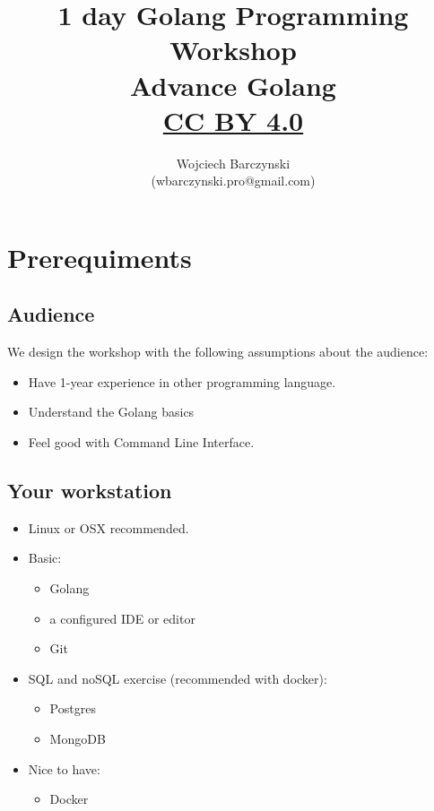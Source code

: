 \documentclass[11pt, letterpaper]{article}
\title{1 day Golang Programming Workshop\\Advance Golang\\{ \small \href{https://creativecommons.org/licenses/by/4.0/}{CC BY 4.0} }  }
\author{Wojciech Barczynski\\(wbarczynski.pro@gmail.com)}
\date{}
\begin{document}

\begin{titlepage}
\maketitle
\end{titlepage}

\tableofcontents
\pagebreak
\section{Prerequiments}

\subsection{Audience}

We design the workshop with the following assumptions about the audience:

\begin{itemize}%
\item Have 1-year experience in other programming language.%
\item Understand the Golang basics
\item Feel good with Command Line Interface.
\end{itemize}%

\subsection{Your workstation}

\begin{itemize}%
\item Linux or OSX recommended.%
\item Basic: \begin{itemize}%
    \item Golang
    \item a configured IDE or editor
    \item Git
    \end{itemize}%
\item {\small SQL} and no{\small SQL} exercise (recommended with docker):
\begin{itemize}%
    \item Postgres
    \item MongoDB
\end{itemize}
\item Nice to have: \begin{itemize}%
    \item Docker
    \end{itemize}
\end{itemize}
\end{document}
